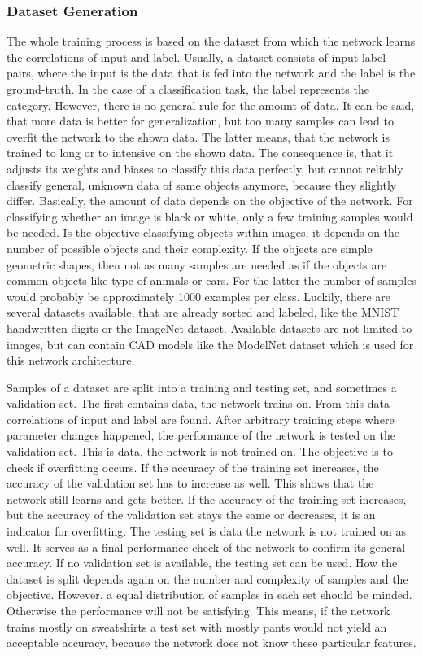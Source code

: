 \subsubsection{Dataset Generation}
\label{sec:dataset-generation}
The whole training process is based on the dataset from which the network learns the correlations of input and label.
Usually, a dataset consists of input-label pairs, where the input is the data that is fed into the network and the label is the ground-truth.
In the case of a classification task, the label represents the category.
However, there is no general rule for the amount of data.
It can be said, that more data is better for generalization, but too many samples can lead to overfit the network to the shown data.
The latter means, that the network is trained to long or to intensive on the shown data.
The consequence is, that it adjusts its weights and biases to classify this data perfectly, but cannot reliably classify general, unknown data of same objects anymore, because they slightly differ.
Basically, the amount of data depends on the objective of the network.
For classifying whether an image is black or white, only a few training samples would be needed.
Is the objective classifying objects within images, it depends on the number of possible objects and their complexity.
If the objects are simple geometric shapes, then not as many samples are needed as if the objects are common objects like type of animals or cars.
For the latter the number of samples would probably be approximately 1000 examples per class.
Luckily, there are several datasets available, that are already sorted and labeled, like the MNIST handwritten digits or the ImageNet dataset.
Available datasets are not limited to images, but can contain CAD models like the ModelNet dataset which is used for this network architecture.

Samples of a dataset are split into a training and testing set, and sometimes a validation set\cite{James2014}.
The first contains data, the network trains on.
From this data correlations of input and label are found.
After arbitrary training steps where parameter changes happened, the performance of the network is tested on the validation set.
This is data, the network is not trained on.
The objective is to check if overfitting occurs.
If the accuracy of the training set increases, the accuracy of the validation set has to increase as well.
This shows that the network still learns and gets better.
If the accuracy of the training set increases, but the accuracy of the validation set stays the same or decreases, it is an indicator for overfitting.
The testing set is data the network is not trained on as well.
It serves as a final performance check of the network to confirm its general accuracy.
If no validation set is available, the testing set can be used.
How the dataset is split depends again on the number and complexity of samples and the objective.
However, a equal distribution of samples in each set should be minded.
Otherwise the performance will not be satisfying.
This means, if the network trains mostly on sweatshirts a test set with mostly pants would not yield an acceptable accuracy, because the network does not know these particular features.

